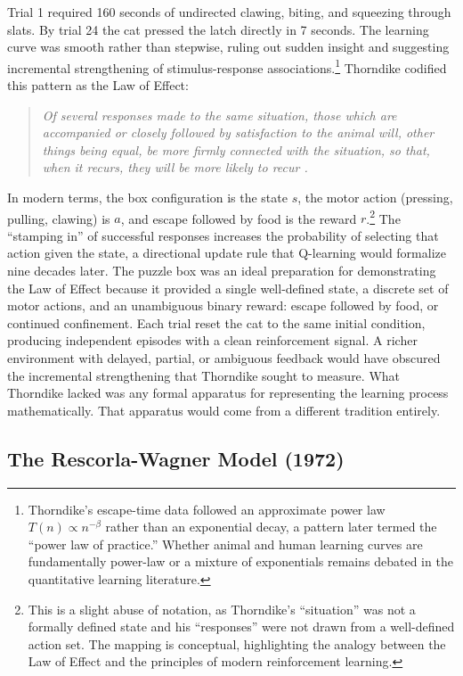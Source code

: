 Trial 1 required 160 seconds of undirected clawing, biting, and squeezing through slats. By trial 24 the cat pressed the latch directly in 7 seconds. The learning curve was smooth rather than stepwise, ruling out sudden insight and suggesting incremental strengthening of stimulus-response associations.\footnote{Thorndike's escape-time data followed an approximate power law $T(n) \propto n^{-\beta}$ rather than an exponential decay, a pattern later termed the ``power law of practice.'' Whether animal and human learning curves are fundamentally power-law or a mixture of exponentials remains debated in the quantitative learning literature.} Thorndike codified this pattern as the Law of Effect:

\begin{quote}\itshape
Of several responses made to the same situation, those which are accompanied or closely followed by satisfaction to the animal will, other things being equal, be more firmly connected with the situation, so that, when it recurs, they will be more likely to recur \citep{Thorndike1898}.
\end{quote}

In modern terms, the box configuration is the state $s$, the motor action (pressing, pulling, clawing) is $a$, and escape followed by food is the reward $r$.\footnote{This is a slight abuse of notation, as Thorndike's ``situation'' was not a formally defined state and his ``responses'' were not drawn from a well-defined action set. The mapping is conceptual, highlighting the analogy between the Law of Effect and the principles of modern reinforcement learning.} The ``stamping in'' of successful responses increases the probability of selecting that action given the state, a directional update rule that Q-learning would formalize nine decades later. The puzzle box was an ideal preparation for demonstrating the Law of Effect because it provided a single well-defined state, a discrete set of motor actions, and an unambiguous binary reward: escape followed by food, or continued confinement. Each trial reset the cat to the same initial condition, producing independent episodes with a clean reinforcement signal. A richer environment with delayed, partial, or ambiguous feedback would have obscured the incremental strengthening that Thorndike sought to measure. What Thorndike lacked was any formal apparatus for representing the learning process mathematically. That apparatus would come from a different tradition entirely.

\subsection{The Rescorla-Wagner Model (1972)}

